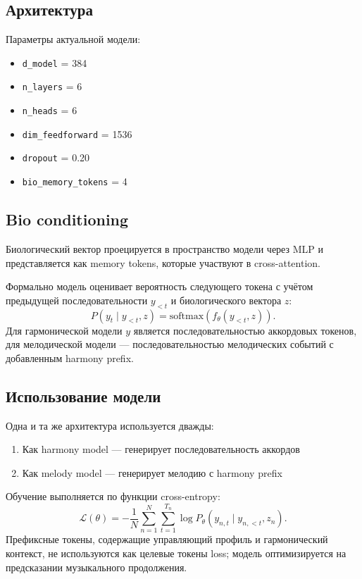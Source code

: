 \subsection{Архитектура}

Параметры актуальной модели:
\begin{itemize}
\item \texttt{d\_model} = 384
\item \texttt{n\_layers} = 6
\item \texttt{n\_heads} = 6
\item \texttt{dim\_feedforward} = 1536
\item \texttt{dropout} = 0.20
\item \texttt{bio\_memory\_tokens} = 4
\end{itemize}

\subsection{Bio conditioning}

Биологический вектор проецируется в пространство модели через MLP и представляется как memory tokens, которые участвуют в cross-attention.

Формально модель оценивает вероятность следующего токена с учётом предыдущей последовательности \(y_{<t}\) и биологического вектора \(z\):
\begin{equation}
P(y_t \mid y_{<t}, z) = \mathrm{softmax}(f_\theta(y_{<t}, z)).
\end{equation}
Для гармонической модели \(y\) является последовательностью аккордовых токенов, для мелодической модели — последовательностью мелодических событий с добавленным harmony prefix.

\subsection{Использование модели}

Одна и та же архитектура используется дважды:
\begin{enumerate}
\item Как harmony model — генерирует последовательность аккордов
\item Как melody model — генерирует мелодию с harmony prefix
\end{enumerate}

Обучение выполняется по функции cross-entropy:
\begin{equation}
\mathcal{L}(\theta) =
- \frac{1}{N}\sum_{n=1}^{N}\sum_{t=1}^{T_n}
\log P_\theta(y_{n,t} \mid y_{n,<t}, z_n).
\end{equation}
Префиксные токены, содержащие управляющий профиль и гармонический контекст, не используются как целевые токены loss; модель оптимизируется на предсказании музыкального продолжения.

